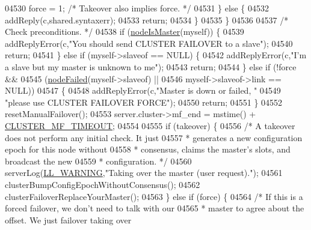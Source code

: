 \begin{DoxyCode}
{{{{{{{{{{{{{{{{{{{{{{{{{{{{{{{{{{{{{{{{{{{{{{{{{{{{{{{{{{{{{{{{{{{{{{{{{{{{{{{{{{{{{{{{{{{{{{{{{{{{{{{{04530                 force = 1; \textcolor{comment}{/* Takeover also implies force. */}
04531             \} \textcolor{keywordflow}{else} \{
04532                 addReply(c,shared.syntaxerr);
04533                 \textcolor{keywordflow}{return};
04534             \}
04535         \}
04536 
04537         \textcolor{comment}{/* Check preconditions. */}
04538         \textcolor{keywordflow}{if} (\hyperlink{cluster_8h_a2d8e84269474d8750565fb3fb67aa436}{nodeIsMaster}(myself)) \{
04539             addReplyError(c,\textcolor{stringliteral}{"You should send CLUSTER FAILOVER to a slave"});
04540             \textcolor{keywordflow}{return};
04541         \} \textcolor{keywordflow}{else} \textcolor{keywordflow}{if} (myself->slaveof == NULL) \{
04542             addReplyError(c,\textcolor{stringliteral}{"I'm a slave but my master is unknown to me"});
04543             \textcolor{keywordflow}{return};
04544         \} \textcolor{keywordflow}{else} \textcolor{keywordflow}{if} (!force &&
04545                    (\hyperlink{cluster_8h_a6a31c614ff4f5ac8ebaa630b0a921c3d}{nodeFailed}(myself->slaveof) ||
04546                     myself->slaveof->link == NULL))
04547         \{
04548             addReplyError(c,\textcolor{stringliteral}{"Master is down or failed, "}
04549                             \textcolor{stringliteral}{"please use CLUSTER FAILOVER FORCE"});
04550             \textcolor{keywordflow}{return};
04551         \}
04552         resetManualFailover();
04553         server.cluster->mf\_end = mstime() + \hyperlink{cluster_8h_a869ee97118edc95fc7ba2abe472ef79e}{CLUSTER\_MF\_TIMEOUT};
04554 
04555         \textcolor{keywordflow}{if} (takeover) \{
04556             \textcolor{comment}{/* A takeover does not perform any initial check. It just}
04557 \textcolor{comment}{             * generates a new configuration epoch for this node without}
04558 \textcolor{comment}{             * consensus, claims the master's slots, and broadcast the new}
04559 \textcolor{comment}{             * configuration. */}
04560             serverLog(\hyperlink{server_8h_a31229b9334bba7d6be2a72970967a14b}{LL\_WARNING},\textcolor{stringliteral}{"Taking over the master (user request)."});
04561             clusterBumpConfigEpochWithoutConsensus();
04562             clusterFailoverReplaceYourMaster();
04563         \} \textcolor{keywordflow}{else} \textcolor{keywordflow}{if} (force) \{
04564             \textcolor{comment}{/* If this is a forced failover, we don't need to talk with our}
04565 \textcolor{comment}{             * master to agree about the offset. We just failover taking over}
}}}}}}}}}}}}}}}}}}}}}}}}}}}}}}}}}}}}}}}}}}}}}}}}}}}}}}}}}}}}}}}}}}}}}}}}}}}}}}}}}}}}}}}}}}}}}}}}}}}}}}}}
\end{DoxyCode}

